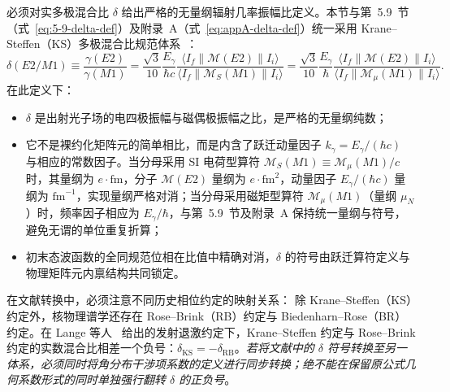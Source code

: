 必须对实多极混合比 $\delta$ 给出严格的无量纲辐射几率振幅比定义。本节与第~5.9~节（式~\eqref{eq:5-9-delta-def}）及附录~A（式~\eqref{eq:appA-delta-def}）统一采用 Krane--Steffen（KS）多极混合比规范体系~\cite{lange-kumar-hamilton-1982-multipole-admixtures, book-hamilton-electromagnetic-interaction}：
\begin{equation}\label{eq:5-7-delta-def}
\delta(E2/M1) \equiv \frac{\gamma(E2)}{\gamma(M1)} = \frac{\sqrt{3}}{10} \frac{E_\gamma}{\hbar c} \frac{\langle I_f \| \mathcal{M}(E2) \| I_i \rangle}{\langle I_f \| \mathcal{M}_S(M1) \| I_i \rangle} = \frac{\sqrt{3}}{10} \frac{E_\gamma}{\hbar} \frac{\langle I_f \| \mathcal{M}(E2) \| I_i \rangle}{\langle I_f \| \mathcal{M}_\mu(M1) \| I_i \rangle}.
\end{equation}
在此定义下：
\begin{itemize}
\item $\delta$ 是出射光子场的电四极振幅与磁偶极振幅之比，是严格的无量纲纯数；
\item 它不是裸约化矩阵元的简单相比，而是内含了跃迁动量因子 $k_\gamma = E_\gamma / (\hbar c)$ 与相应的常数因子。当分母采用 SI 电荷型算符 $\mathcal{M}_S(M1) \equiv \mathcal{M}_\mu(M1) / c$ 时，其量纲为 $e\cdot\mathrm{fm}$，分子 $\mathcal{M}(E2)$ 量纲为 $e\cdot\mathrm{fm}^2$，动量因子 $E_\gamma/(\hbar c)$ 量纲为 $\mathrm{fm}^{-1}$，实现量纲严格对消；当分母采用磁矩型算符 $\mathcal{M}_\mu(M1)$（量纲 $\mu_N$）时，频率因子相应为 $E_\gamma/\hbar$，与第~5.9~节及附录~A 保持统一量纲与符号，避免无谓的单位重复折算；
\item 初末态波函数的全同规范位相在比值中精确对消，$\delta$ 的符号由跃迁算符定义与物理矩阵元内禀结构共同锁定。
\end{itemize}

在文献转换中，必须注意不同历史相位约定的映射关系：
除 Krane--Steffen（KS）约定外，核物理谱学还存在 Rose--Brink（RB）约定与 Biedenharn--Rose（BR）约定。在 Lange 等人~\cite{lange-kumar-hamilton-1982-multipole-admixtures} 给出的发射退激约定下，Krane--Steffen 约定与 Rose--Brink 约定的实数混合比相差一个负号：$\delta_{\mathrm{KS}} = -\delta_{\mathrm{RB}}$。\emph{若将文献中的 $\delta$ 符号转换至另一体系，必须同时将角分布干涉项系数的定义进行同步转换；绝不能在保留原公式几何系数形式的同时单独强行翻转 $\delta$ 的正负号}。

